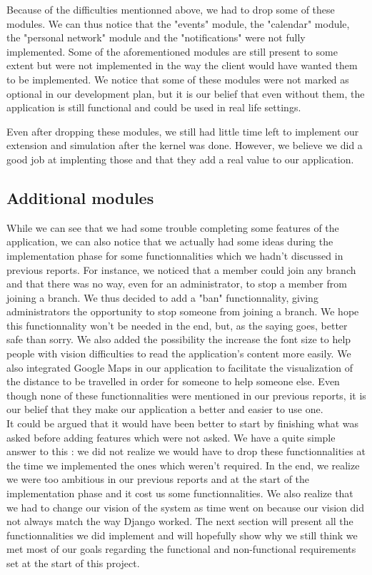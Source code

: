 \documentclass[11pt, a4paper]{article}   	%
\begin{document}
Because of the difficulties mentionned above, we had to drop some of these modules. We can thus notice that the "events" module, the "calendar" module, the "personal network" module and the "notifications" were not fully implemented. Some of the aforementioned modules are still present to some extent but were not implemented in the way the client would have wanted them to be implemented. We notice that some of these modules were not marked as optional in our development plan, but it is our belief that even without them, the application is still functional and could be used in real life settings. 

Even after dropping these modules, we still had little time left to implement our extension and simulation after the kernel was done. However, we believe we did a good job at implenting those and that they add a real value to our application.

\subsection{Additional modules}
While we can see that we had some trouble completing some features of the application, we can also notice that we actually had some ideas during the implementation phase for some functionnalities which we hadn't discussed in previous reports. For instance, we noticed that a member could join any branch and that there was no way, even for an administrator, to stop a member from joining a branch. We thus decided to add a "ban" functionnality, giving administrators the opportunity to stop someone from joining a branch. We hope this functionnality won't be needed in the end, but, as the saying goes, better safe than sorry. We also added the possibility the increase the font size to help people with vision difficulties to read the application's content more easily.  We also integrated Google Maps in our application to facilitate the visualization of the distance to be travelled in order for someone to help someone else. Even though none of these functionnalities were mentioned in our previous reports, it is our belief that they make our application a better and easier to use one.\\

It could be argued that it would have been better to start by finishing what was asked before adding features which were not asked. We have a quite simple answer to this : we did not realize we would have to drop these functionnalities at the time we implemented the ones which weren't required. In the end, we realize we were too ambitious in our previous reports and at the start of the implementation phase and it cost us some functionnalities. We also realize that we had to change our vision of the system as time went on because our vision did not always match the way Django worked. The next section will present all the functionnalities we did implement and will hopefully show why we still think we met most of our goals regarding the functional and non-functional requirements set at the start of this project.
\end{document}
